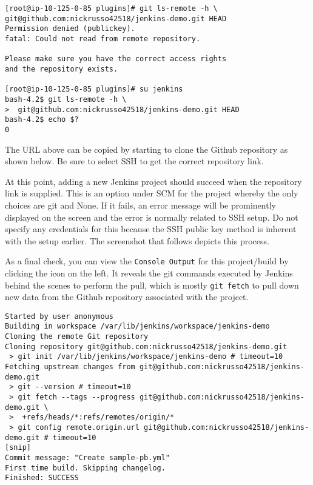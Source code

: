 \begin{verbatim}
[root@ip-10-125-0-85 plugins]# git ls-remote -h \
git@github.com:nickrusso42518/jenkins-demo.git HEAD
Permission denied (publickey).
fatal: Could not read from remote repository.

Please make sure you have the correct access rights
and the repository exists.

[root@ip-10-125-0-85 plugins]# su jenkins
bash-4.2$ git ls-remote -h \
>  git@github.com:nickrusso42518/jenkins-demo.git HEAD
bash-4.2$ echo $?
0
\end{verbatim}

The URL above can be copied by starting to clone the Github repository as
shown below. Be sure to select SSH to get the correct repository link.


At this point, adding a new Jenkins project should succeed when the repository
link is supplied. This is an option under SCM for the project whereby the only
choices are git and None. If it fails, an error message will be prominently
displayed on the screen and the error is normally related to SSH setup. Do not
specify any credentials for this because the SSH public key method is inherent
with the setup earlier. The screenshot that follows depicts this process.


As a final check, you can view the \verb|Console Output| for this
project/build by clicking the icon on the left. It reveals the git commands
executed by Jenkins behind the scenes to perform the pull, which is mostly
\verb|git fetch| to pull down new data from the Github repository associated
with the project.

\begin{verbatim}
Started by user anonymous
Building in workspace /var/lib/jenkins/workspace/jenkins-demo
Cloning the remote Git repository
Cloning repository git@github.com:nickrusso42518/jenkins-demo.git
 > git init /var/lib/jenkins/workspace/jenkins-demo # timeout=10
Fetching upstream changes from git@github.com:nickrusso42518/jenkins-demo.git
 > git --version # timeout=10
 > git fetch --tags --progress git@github.com:nickrusso42518/jenkins-demo.git \
 >  +refs/heads/*:refs/remotes/origin/*
 > git config remote.origin.url git@github.com:nickrusso42518/jenkins-demo.git # timeout=10
[snip]
Commit message: "Create sample-pb.yml"
First time build. Skipping changelog.
Finished: SUCCESS
\end{verbatim}


